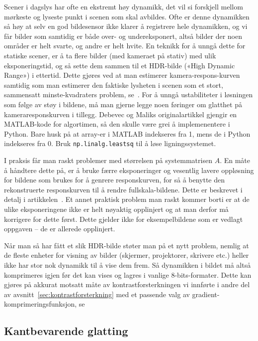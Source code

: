 \documentclass[11pt,a4paper]{article}
\begin{document}
Scener i dagslys har ofte en ekstremt høy dynamikk, det vil si forskjell mellom mørkeste og lyseste punkt i scenen som skal avbildes. Ofte er denne dynamikken så høy at selv en god bildesensor ikke klarer å registrere hele dynamikken, og vi får bilder som samtidig er både over- og undereksponert, altså bilder der noen områder er helt svarte, og andre er helt hvite. En teknikk for å unngå dette for statiske scener, er å ta flere bilder (med kameraet på stativ) med ulik eksponeringstid, og så sette dem sammen til et HDR-bilde («High Dynamic Range») i ettertid. Dette gjøres ved at man estimerer kamera-respons-kurven samtidig som man estimerer den faktiske lysheten i scenen som et stort, sammensatt minste-kvadraters problem, se~\cite{Debevec:97}. For å unngå ustabiliteter i løsningen som følge av støy i bildene, må man gjerne legge noen føringer om glatthet på kameraresponskurven i tillegg. Debevec og Maliks originalartikkel gjengir en MATLAB-kode for algortimen, så den skulle være grei å implemenentere i Python. Bare husk på at array-er i MATLAB indekseres fra 1, mens de i Python indekseres fra 0. Bruk \texttt{np.linalg.leastsq} til å løse ligningssystemet.

I praksis får man raskt problemer med størrelsen på systemmatrisen $A$. En måte å håndtere dette på, er å bruke færre eksponeringer og vesentlig lavere oppløsning for bildene som brukes for å genrere responskurven, for så å benytte den rekonstruerte responskurven til å rendre fullskala-bildene. Dette er beskrevet i detalj i artikkelen~\cite{Debevec:97}. Et annet praktisk problem man raskt kommer borti er at de ulike eksponeringene ikke er helt nøyaktig opplinjert og at man derfor må korrigere for dette først. Dette gjelder ikke for eksempelbildene som er vedlagt oppgaven – de er allerede opplinjert.

Når man så har fått et slik HDR-bilde støter man på et nytt problem, nemlig at de fleste enheter for visning av bilder (skjermer, projektorer, skrivere etc.) heller ikke har stor nok dynamikk til å vise dem frem. Så dynamikken i bildet må altså komprimeres igjen før det kan vises og lagres i vanlige 8-bits-formater. Dette kan gjøres på akkurat motsatt måte av kontrastforsterkningen vi innførte i andre del av avsnitt~\ref{sec:kontrastforsterkning} med et passende valg av gradient-komprimeringsfunksjon, se~\cite{Fattal:02}

\subsection{Kantbevarende glatting}
\label{sec:utvidelse_end}
\end{document}
